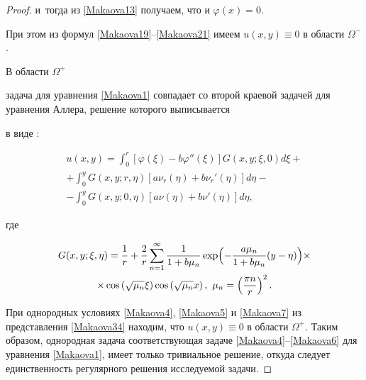 \begin{proof}
и~тогда  из \eqref{Makaova13} получаем, что и $\varphi(x)=0$.  

При этом из формул \eqref{Makaova19}--\eqref{Makaova21} имеем $u(x,y) \equiv 0$ в области $\Omega^-$.





В области $\Omega^+$

задача для уравнения \eqref{Makaova1} совпадает со второй краевой задачей для уравнения Аллера, решение которого выписывается 

в виде \cite{Makaova_25}:

\begin{multline}

u(x, y)=\int _{0}^{r}

\left [ \varphi(\xi)-b \varphi''(\xi)

 \right ]G(x, y; \xi,0)d\xi+

\\

\label{Makaova34}

+\int _{0}^{y}  

G(x, y; r,\eta) \left [a \nu_r(\eta)+b \nu_r'(\eta) \right ]d\eta- \\

-

\int _{0}^{y}

G(x, y; 0, \eta) \left [a\nu(\eta)+b \nu'(\eta) 

\right ] d\eta,

 \end{multline}

 где

\begin{multline}

G(x,y; \xi, \eta)

=\frac{1}{r}  

+\frac{2}{r} 

\sum_{n=1}^{\infty} 

\frac{1}{1+b\mu_n}

\exp \Bigl({ -\frac{a \mu_n}{1+b\mu_n} (y-\eta) }\Bigr) \times \\ \times

\cos \left ( \sqrt{ \mu_n} \xi \right ) \cos \left (\sqrt{ \mu_n} x  \right ), 

\ \mu_n =\left (\frac{\pi n}{r} \right )^2 . 

 \end{multline}



При однородных условиях   \eqref{Makaova4}, \eqref{Makaova5} и \eqref{Makaova7} из представления \eqref{Makaova34} находим, что  $u(x,y) \equiv 0$ в области $\Omega^+$. Таким образом, однородная задача соответствующая задаче \eqref{Makaova4}--\eqref{Makaova6} для уравнения \eqref{Makaova1}, имеет только тривиальное решение, откуда следует единственность регулярного решения исследуемой задачи.




\end{proof}
